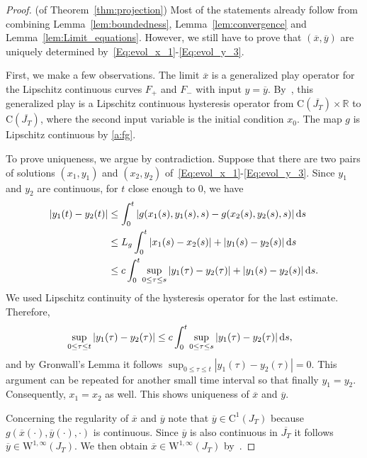 \documentclass[12pt]{article}
\def\txtd{{\textnormal{d}}}
\begin{document}
\begin{proof}(of Theorem~\ref{thm:projection})
Most of the statements already follow from combining Lemma~\ref{lem:boundedness}, 
Lemma~\ref{lem:convergence} and Lemma~\ref{lem:Limit_equations}. However, we still have 
to prove that $(\overline{x},\overline{y})$ are uniquely determined 
by~\eqref{Eq:evol_x_1}-\eqref{Eq:evol_y_3}.
	
First, we make a few observations. The limit $\overline{x}$ is a generalized play 
operator for the Lipschitz continuous curves $F_+$ and $F_-$ with input $y=\overline{y}$. 
By~\cite[III.2.,Theorem 2.2]{Visintin}, this generalized play is a Lipschitz continuous 
hysteresis operator from $\mathrm{C}(\overline{J_T})\times \mathbb{R}$ to 
$\mathrm{C}(\overline{J_T})$, where the second input variable is the initial condition $x_0$. 
The map $g$ is Lipschitz continuous by \ref{a:fg}. 

To prove uniqueness, we argue by contradiction. Suppose that there are two pairs of 
solutions $(x_1,y_1)$ and $(x_2,y_2)$ of~\eqref{Eq:evol_x_1}-\eqref{Eq:evol_y_3}.
Since $y_1$ and $y_2$ are continuous, for $t$ close enough to $0$, we have
\begin{alignat*}{2}
|y_1(t)-y_2(t)|
&\leq \int_{0}^{t} |g(x_1(s),y_1(s),s) - g(x_2(s),y_2(s),s)| \,\txtd s\\
	&\leq L_g \int_{0}^{t} |x_1(s)-x_2(s)| + |y_1(s)-y_2(s)| \,\txtd s\\
	&\leq c \int_{0}^{t} \sup_{0\leq \tau \leq s}|y_1(\tau)-y_2(\tau)| + |y_1(s)-y_2(s)|  
	\,\txtd s.
\end{alignat*}
We used Lipschitz continuity of the hysteresis operator for the last estimate. Therefore,
\begin{alignat*}{2}
&\sup_{0\leq \tau \leq t}|y_1(\tau)-y_2(\tau)|
\leq c \int_{0}^{t} \sup_{0\leq \tau \leq s}|y_1(\tau)-y_2(\tau)| \,\txtd s,
	\end{alignat*}
and by Gronwall's Lemma it follows $\sup_{0\leq \tau \leq t}|y_1(\tau)-y_2(\tau)|=0$.
This argument can be repeated for another small time interval so that finally $y_1=y_2$.
Consequently, $x_1=x_2$ as well. This shows uniqueness of $\overline{x}$ and $\overline{y}$.
	
Concerning the regularity of $\overline{x}$ and $\overline{y}$ note that	
$\overline{y}\in \mathrm{C}^1(J_T)$ because $g(\overline{x}(\cdot),\overline{y}(\cdot),\cdot)$ 
is continuous. Since $\overline{y}$ is also continuous in $\overline{J_T}$ it follows 
$\overline{y}\in \mathrm{W}^{1,\infty}(J_T)$. We then obtain $\overline{x}\in 
\mathrm{W}^{1,\infty}(J_T)$ by~\cite[III.2.,Theorem 2.3]{Visintin}.
	

\end{proof}
\end{document}
